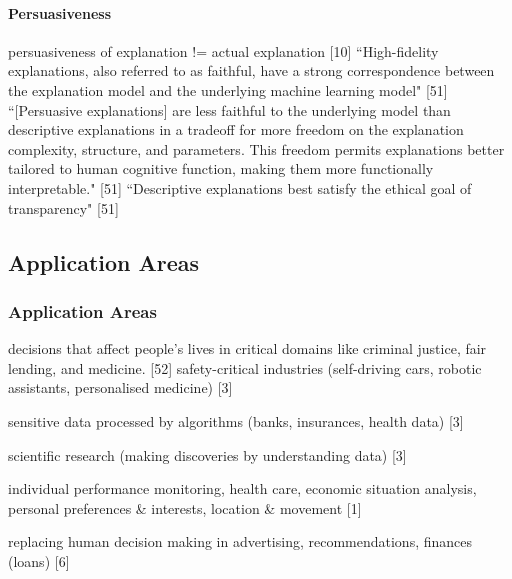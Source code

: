 \paragraph{Persuasiveness}
persuasiveness of explanation != actual explanation [10]\newline
``High-fidelity explanations, also referred to as faithful, have a strong correspondence between the explanation model and the underlying machine learning model" [51]\newline
``[Persuasive explanations] are less faithful to the underlying model than descriptive explanations in a tradeoff for more freedom on the explanation complexity, structure, and parameters. This freedom permits explanations better tailored to human cognitive function, making them more functionally interpretable." [51]\newline
``Descriptive explanations best satisfy the ethical goal of transparency" [51]\newline






\subsection{Application Areas}

\subsubsection{Application Areas}
decisions that affect people’s lives in critical domains like criminal
justice, fair lending, and medicine. [52]\newline
safety-critical industries (self-driving cars, robotic assistants, personalised medicine) [3]\newline

sensitive data processed by algorithms (banks, insurances, health data) [3]\newline

scientific research (making discoveries by understanding data) [3]\newline

individual performance monitoring, health care, economic situation analysis, personal preferences \& interests, location \& movement [1]\newline

replacing human decision making in advertising, recommendations, finances (loans) [6] \newline

